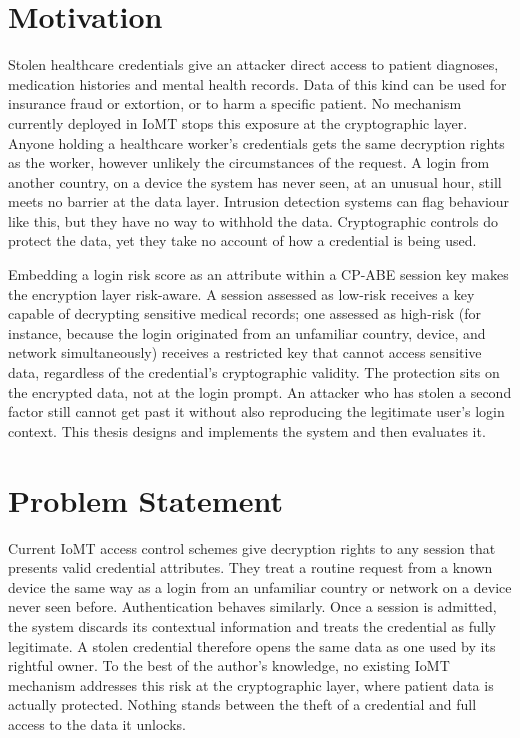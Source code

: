 
\section{Motivation}
\label{sec:motivation}

Stolen healthcare credentials give an attacker direct access to patient diagnoses, medication histories and mental health records. Data of this kind can be used for insurance fraud or extortion, or to harm a specific patient. No mechanism currently deployed in IoMT stops this exposure at the cryptographic layer. Anyone holding a healthcare worker's credentials gets the same decryption rights as the worker, however unlikely the circumstances of the request. A login from another country, on a device the system has never seen, at an unusual hour, still meets no barrier at the data layer. Intrusion detection systems can flag behaviour like this, but they have no way to withhold the data. Cryptographic controls do protect the data, yet they take no account of how a credential is being used.

Embedding a login risk score as an attribute within a CP-ABE session key makes the encryption layer risk-aware. A session assessed as low-risk receives a key capable of decrypting sensitive medical records; one assessed as high-risk (for instance, because the login originated from an unfamiliar country, device, and network simultaneously) receives a restricted key that cannot access sensitive data, regardless of the credential's cryptographic validity. The protection sits on the encrypted data, not at the login prompt. An attacker who has stolen a second factor still cannot get past it without also reproducing the legitimate user's login context. This thesis designs and implements the system and then evaluates it.

\section{Problem Statement}
\label{sec:problemstatement}

Current IoMT access control schemes give decryption rights to any session that presents valid credential attributes. They treat a routine request from a known device the same way as a login from an unfamiliar country or network on a device never seen before. Authentication behaves similarly. Once a session is admitted, the system discards its contextual information and treats the credential as fully legitimate. A stolen credential therefore opens the same data as one used by its rightful owner. To the best of the author's knowledge, no existing IoMT mechanism addresses this risk at the cryptographic layer, where patient data is actually protected. Nothing stands between the theft of a credential and full access to the data it unlocks.

